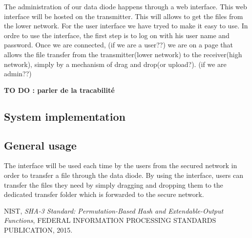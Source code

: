 \documentclass[a4paper,10pt]{article}
\begin{document}
The administration of our data diode happens through a web interface.
This web interface will be hosted on the transmitter. This will allows to get the
files from the lower network. For the user interface we have tryed to make it
easy to use. In ordre to use the interface, the first step is to log on with his
user name and password.  Once we are connected, (if we are a user??)
we are on a page that allows the file transfer from the transmitter(lower network)
to the receiver(high network), simply by a mechanism of drag and drop(or upload?).
(if we are admin??)

\textbf{TO DO : parler de la tracabilité}


\subsection{System implementation}
\subsection{General usage}
The interface will be used each time by the users from the secured network
in order to transfer a file through the data diode. By using the interface,
users can transfer the files they need by simply dragging and dropping them to
the dedicated transfer folder which is forwarded to the secure network.


\begin{thebibliography}{9}

NIST,
\textit{SHA-3 Standard: Permutation-Based Hash and Extendable-Output Functions},
FEDERAL INFORMATION PROCESSING STANDARDS PUBLICATION,
2015.

\end{thebibliography}
\end{document}
